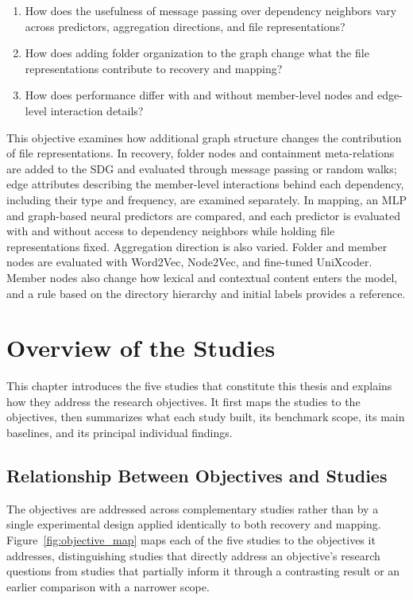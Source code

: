\begin{enumerate}[label=RQ3.\arabic*, leftmargin=3em, itemsep=-0.05pt]
    \item How does the usefulness of message passing over dependency neighbors vary across predictors, aggregation directions, and file representations?
    \item How does adding folder organization to the graph change what the file representations contribute to recovery and mapping?
    \item How does performance differ with and without member-level nodes and edge-level interaction details?
\end{enumerate}
This objective examines how additional graph structure changes the contribution of file representations. In recovery, folder nodes and containment meta-relations are added to the SDG and evaluated through message passing or random walks; edge attributes describing the member-level interactions behind each dependency, including their type and frequency, are examined separately. In mapping, an MLP and graph-based neural predictors are compared, and each predictor is evaluated with and without access to dependency neighbors while holding file representations fixed. Aggregation direction is also varied. Folder and member nodes are evaluated with Word2Vec, Node2Vec, and fine-tuned UniXcoder. Member nodes also change how lexical and contextual content enters the model, and a rule based on the directory hierarchy and initial labels provides a reference.
\chapter{Overview of the Studies}
\label{ch:studies}
\chaptertoc

This chapter introduces the five studies that constitute this thesis and explains how they address the research objectives. It first maps the studies to the objectives, then summarizes what each study built, its benchmark scope, its main baselines, and its principal individual findings.

\section{Relationship Between Objectives and Studies}
\label{sec:objectives-studies}

The objectives are addressed across complementary studies rather than by a single experimental design applied identically to both recovery and mapping. Figure~\ref{fig:objective_map} maps each of the five studies to the objectives it addresses, distinguishing studies that directly address an objective's research questions from studies that partially inform it through a contrasting result or an earlier comparison with a narrower scope.

